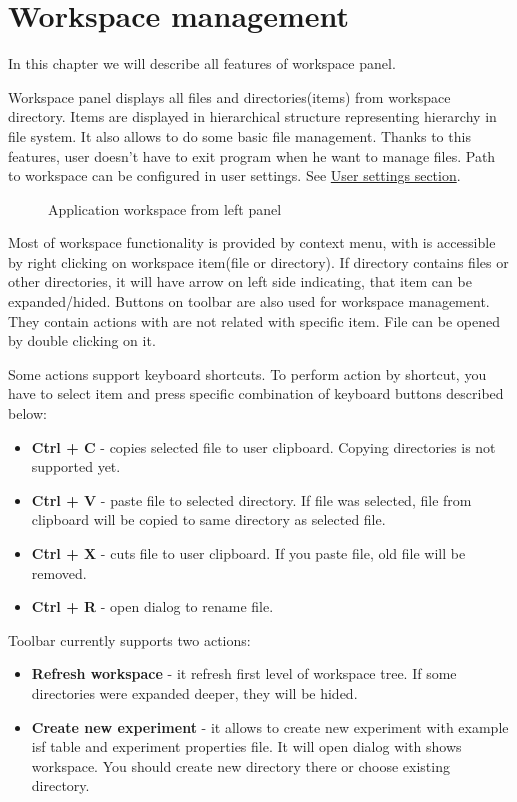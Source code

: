 \section{Workspace management}\label{section:workspace}

In this chapter we will describe all features of workspace panel.

Workspace panel displays all files and directories(items) from workspace directory. Items are displayed in hierarchical structure representing hierarchy in file system. It also allows to do some basic file management. Thanks to this features, user doesn't have to exit program when he want to manage files. Path to workspace can be configured in user settings. See \hyperref[section:user-settings]{User settings section}.

\begin{figure*}[!ht] 
	\centering
	\caption{Application workspace from left panel}
\end{figure*}

Most of workspace functionality is provided by context menu, with is accessible by right clicking on workspace item(file or directory). If directory contains files or other directories, it will have arrow on left side indicating, that item can be expanded/hided. Buttons on toolbar are also used for workspace management. They contain actions with are not related with specific item. File can be opened by double clicking on it.

Some actions support keyboard shortcuts. To perform action by shortcut, you have to select item and press specific combination of keyboard buttons described below:
\begin{itemize}
	\item \textbf{Ctrl + C} - copies selected file to user clipboard. Copying directories is not supported yet.
	\item \textbf{Ctrl + V} - paste file to selected directory. If file was selected, file from clipboard will be copied to same directory as selected file.
	\item \textbf{Ctrl + X} - cuts file to user clipboard. If you paste file, old file will be removed.
	\item \textbf{Ctrl + R} - open dialog to rename file.
\end{itemize}


Toolbar currently supports two actions:

\begin{itemize}
	\item \textbf{Refresh workspace} - it refresh first level of workspace tree. If some directories were expanded deeper, they will be hided.
	\item \textbf{Create new experiment} - it allows to create new experiment with example isf table and experiment properties file. It will open dialog with shows workspace. You should create new directory there or choose existing directory.
\end{itemize}


